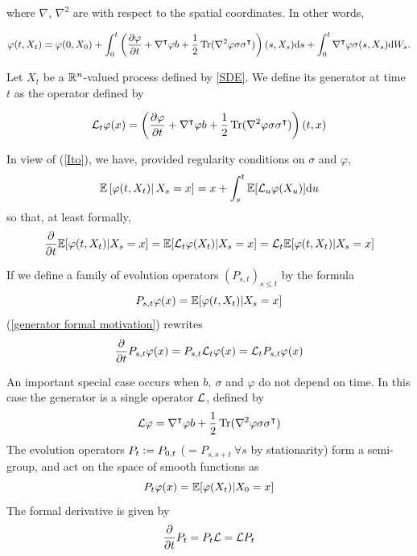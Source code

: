 where $\nabla$, $\nabla^2$ are with respect to the spatial coordinates. In other words,


\begin{equation}
    \label{Ito}
    \varphi(t,X_t)= \varphi(0,X_0)+\int_0^t\left( \frac{\partial \varphi}{\partial t} + \nabla^\intercal\varphi b + \frac12 \operatorname{Tr}(\nabla^2\varphi\sigma\sigma^\intercal) \right)(s,X_s) \text ds + \int_0^t\nabla^\intercal \varphi\sigma(s,X_s)\text dW_s.
\end{equation}

    \begin{definition}
        Let $X_t$ be a $\mathbb{R}^n$-valued process defined by \ref{SDE}. We define its generator at time $t$ as the operator defined by

        \begin{equation}
            \label{Generator}
            \mathcal{L}_t \varphi(x)=\left(\frac{\partial \varphi}{\partial t} + \nabla^\intercal\varphi b + \frac12 \operatorname{Tr}(\nabla^2\varphi \sigma\sigma^\intercal)\right)(t,x)
        \end{equation}

    \end{definition}

    In view of (\ref{Ito}), we have, provided regularity conditions on $\sigma$ and $\varphi$,
    $$\mathbb{E}\left[\varphi(t,X_t)\right|X_s=x]=x+\int_s^t \mathbb{E}[\mathcal{L}_u\varphi(X_u)] \text du$$
    so that, at least formally,
    \begin{equation}
    \label{generator formal motivation}
    \frac{\partial}{\partial t}\mathbb{E}[\varphi(t,X_t) | X_{s}=x]=\mathbb{E}[\mathcal{L}_{t} \varphi(X_{t})|X_{s}=x]=\mathcal{L}_{t}\mathbb{E}[\varphi(t,X_{t})|X_{s}=x]
    \end{equation}

    If we define a family of evolution operators $(P_{s,t})_{s\leq t}$ by the formula
    $$P_{s,t} \varphi (x)= \mathbb{E}[ \varphi (t,X_t) | X_s=x] $$
    (\ref{generator formal motivation}) rewrites
    $$ \frac{\partial}{\partial t} P_{s,t} \varphi (x)=P_{s,t}\mathcal{L}_t\varphi(x)=\mathcal{L}_t P_{s,t}\varphi(x)$$
    
    An important special case occurs when $b,\ \sigma$ and $\varphi$ do not depend on time. In this case the generator is a single operator $\mathcal{L}$, defined by
    $$\mathcal{L} \varphi = \nabla^\intercal \varphi b + \frac12 \operatorname{Tr}(\nabla^2 \varphi \sigma \sigma ^\intercal)$$ 
    The evolution operators $P_t \mathrel{\mathop:}= P_{0,t}$ ($ = P_{s,s+t}\ \forall s$ by stationarity) form a semi-group, and act on the space of smooth functions as
    $$ P_t \varphi(x)= \mathbb{E}[\varphi(X_t)| X_0=x]$$
    The formal derivative is given by
    $$ \frac{\partial}{\partial t}P_t=P_t\mathcal{L}=\mathcal{L} P_t$$
    
